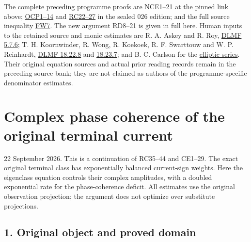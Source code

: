 \documentclass[10pt]{article}
\begin{document}
The complete preceding programme proofs are NCE1--21 at the pinned link above; \href{https://github.com/KokunoYumeto/zeta-function-research-reader/blob/5c69161ca70ee187f41df0bfe786e8b6eebed422/workbenches/splitzero-tandem/continuations/20260922-current-effective-cutoff/OBSERVED_CURRENT_PLANE.tex\#L36}{OCP1--14} and \href{https://github.com/KokunoYumeto/zeta-function-research-reader/blob/5c69161ca70ee187f41df0bfe786e8b6eebed422/workbenches/splitzero-tandem/continuations/20260922-current-effective-cutoff/CUTOFF_CURRENT_CONNECTION.md\#L190}{RC22--27} in the sealed 026 edition; and the full source inequality \href{https://github.com/KokunoYumeto/zeta-function-research-reader/blob/6cf5b3aa8ff395eba6b5512b28d117334da5767b/workbenches/splitzero-tandem/continuations/20260922-cutoff-profile/RETAINED_COMPLETE_PROOF_SOURCES.tex\#L120040}{FW7}. The new argument RD8--21 is given in full here. Human inputs to the retained source and monic estimates are R. A. Askey and R. Roy, \href{https://dlmf.nist.gov/5.7.E6}{DLMF 5.7.6}; T. H. Koornwinder, R. Wong, R. Koekoek, R. F. Swarttouw and W. P. Reinhardt, \href{https://dlmf.nist.gov/18.22.E8}{DLMF 18.22.8} and \href{https://dlmf.nist.gov/18.23.E7}{18.23.7}; and B. C. Carlson for the \href{https://dlmf.nist.gov/19.5.E1}{elliptic series}. Their original equation sources and actual prior reading records remain in the preceding source bank; they are not claimed as authors of the programme-specific denominator estimates.

\clearpage
\section{Complex phase coherence of the original terminal current}\label{complex-phase-coherence-of-the-original-terminal-current}

22 September 2026. This is a continuation of RC35--44 and CE1--29. The exact original terminal class has exponentially balanced current-sign weights. Here the eigenclass equation controls their complex amplitudes, with a doubled exponential rate for the phase-coherence deficit. All estimates use the original observation projection; the argument does not optimize over substitute projections.

\subsection{1. Original object and proved domain}\label{original-object-and-proved-domain}
\end{document}
